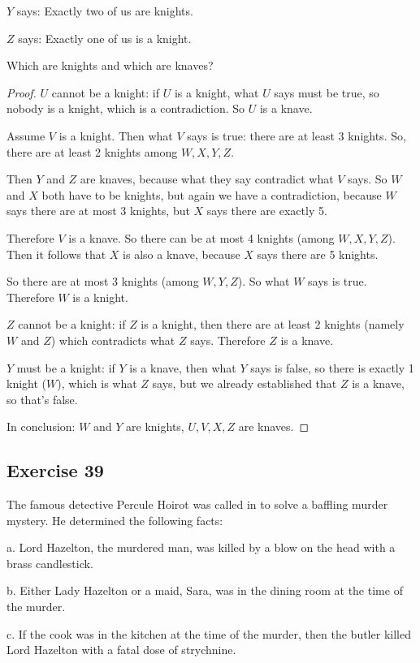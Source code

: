 \documentclass[14pt]{extarticle}
\begin{document}
$Y$ says: Exactly two of us are knights.

$Z$ says: Exactly one of us is a knight.

Which are knights and which are knaves?

\begin{proof}
$U$ cannot be a knight: if $U$ is a knight, what $U$ says must be true, so nobody is a knight, which is a contradiction. So $U$ is a knave.

Assume $V$ is a knight. Then what $V$ says is true: there are at least 3 knights. So, there are at least 2 knights among $W, X, Y, Z$.

Then $Y$ and $Z$ are knaves, because what they say contradict what $V$ says. So $W$ and $X$ both have to be knights, but again we have a contradiction, because $W$ says there are at most 3 knights, but $X$ says there are exactly 5.

Therefore $V$ is a knave. So there can be at most 4 knights (among $W, X, Y, Z$). Then it follows that $X$ is also a knave, because $X$ says there are 5 knights.

So there are at most 3 knights (among $W, Y, Z$). So what $W$ says is true. Therefore $W$ is a knight.

$Z$ cannot be a knight: if $Z$ is a knight, then there are at least 2 knights (namely $W$ and $Z$) which contradicts what $Z$ says. Therefore $Z$ is a knave.

$Y$ must be a knight: if $Y$ is a knave, then what $Y$ says is false, so there is exactly 1 knight ($W$), which is what $Z$ says, but we already established that $Z$ is a knave, so that's false.

In conclusion: $W$ and $Y$ are knights, $U,V,X,Z$ are knaves. \end{proof}

\subsection{Exercise 39}
The famous detective Percule Hoirot was called in to solve a baffling murder mystery. He determined the following facts:

a. Lord Hazelton, the murdered man, was killed by a blow on the head with a brass candlestick.

b. Either Lady Hazelton or a maid, Sara, was in the dining room at the time of the murder.

c. If the cook was in the kitchen at the time of the murder, then the butler killed Lord Hazelton with a fatal dose of strychnine.
\end{document}

